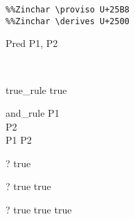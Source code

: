 \begin{verbatim}
%%Zinchar \proviso U+25B8
%%Zinchar \derives U+2500
\end{verbatim}

\begin{zedjoker}{Pred} P1, P2\end{zedjoker} \\

\begin{zedrule}{true_rule}
  true
\end{zedrule}

\begin{zedrule}{and_rule}
  P1 \\
  P2 \\
\derives
  P1 \land P2  
\end {zedrule}

\begin{zed}
  \vdash? true
\end{zed}

\begin{zed}
  \vdash? true \land true
\end{zed}

\begin{zed}
  \vdash? true \land true \land true
\end{zed}

